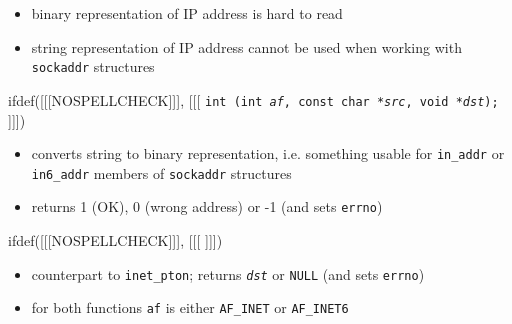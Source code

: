 \begin{slide}
\begin{itemize}
\item binary representation of IP address is hard to read
\item string representation of IP address cannot be used when working with
\texttt{sockaddr} structures
\end{itemize}
ifdef([[[NOSPELLCHECK]]], [[[
\texttt{int (int \emph{af}, const char *\emph{src},
void *\emph{dst});}
]]])
\begin{itemize}
\item converts string to binary representation, i.e. something usable for
\texttt{in\_addr} or \texttt{in6\_addr} members of \texttt{sockaddr} structures
\item returns 1 (OK), 0 (wrong address) or -1 (and sets \texttt{errno})
\end{itemize}
ifdef([[[NOSPELLCHECK]]], [[[
]]])
\begin{itemize}
\item counterpart to \texttt{inet\_pton}; returns \emph{\texttt{dst}} or
\texttt{NULL} (and sets \texttt{errno})
\end{itemize}
\begin{itemize}
\item for both functions \texttt{af} is either \texttt{AF\_INET} or
\texttt{AF\_INET6}
\end{itemize}
\end{slide}


